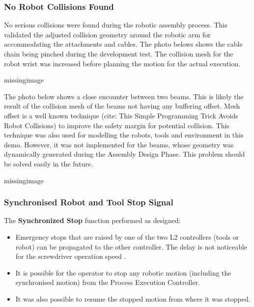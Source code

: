 \subsubsection{No Robot Collisions Found}
\label{subsubsection:exploration_4_no_robot_collisions_found}

No serious collisions were found during the robotic assembly process. This validated the adjusted collision geometry around the robotic arm for accommodating the attachments and cables. The photo belows shows the cable chain being pinched during the development test. The collision mesh for the robot wrist was increased before planning the motion for the actual execution.

missingimage

The photo below shows a close encounter between two beams. This is likely the result of the collision mesh of the beams not having any buffering offset. Mesh offset is a well known technique (cite: This Simple Programming Trick Avoids Robot Collisions) to improve the safety margin for potential collision. This technique was also used for modelling the robots, tools and environment in this demo. However, it was not implemented for the beams, whose geometry was dynamically generated during the Assembly Design Phase. This problem should be solved easily in the future.

missingimage

\subsubsection{Synchronised Robot and Tool Stop Signal}
\label{subsubsection:exploration_4_synchronised_robot_and_tool_stop_signal}

The \textbf{Synchronized Stop} function  performed as designed:
\begin{itemize}
    \item Emergency stops that are raised by one of the two L2 controllers (tools or robot) can be propagated to the other controller. The delay is not noticeable for the screwdriver operation speed .
    \item It is possible for the operator to stop any robotic motion (including the synchronised motion) from the Process Execution Controller.
    \item It was also possible to resume the stopped motion from where it was stopped.
\end{itemize}

